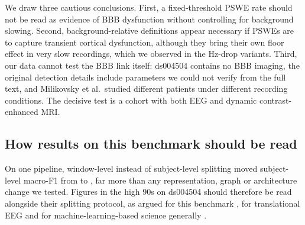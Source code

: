 We draw three cautious conclusions. First, a fixed-threshold PSWE rate should not be read as evidence
of BBB dysfunction without controlling for background slowing. Second, background-relative
definitions appear necessary if PSWEs are to capture transient cortical dysfunction, although they bring
their own floor effect in very slow recordings, which we observed in the Hz-drop variants. Third, our
data cannot test the BBB link itself: ds004504 contains no BBB imaging, the original detection
details include parameters we could not verify from the full text, and Milikovsky et al.\ studied
different patients under different recording conditions. The decisive test is a cohort with both EEG
and dynamic contrast-enhanced MRI.

\subsection{How results on this benchmark should be read}\label{sec:disc-bench}
On one pipeline, window-level instead of subject-level splitting moved subject-level macro-F1 from
\cleakPThreespatialCorrectSubj{} to \cleakPThreespatialLeakySubj{}, far more than any representation, graph or
architecture change we tested. Figures in the high 90s on ds004504 should therefore be read alongside
their splitting protocol, as argued for this benchmark \cite{R1}, for translational EEG \cite{L2,L3,L4} and
for machine-learning-based science generally \cite{F8,L1,L5}.

